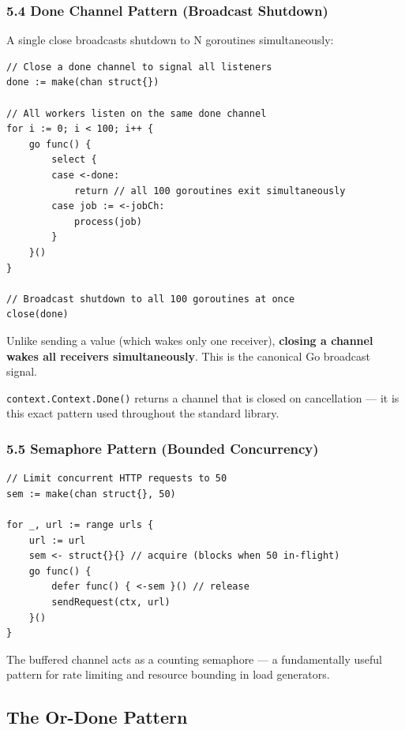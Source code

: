 \documentclass[11pt,a4paper,oneside]{book}
\begin{document}
\subsubsection{5.4 Done Channel Pattern (Broadcast
Shutdown)}

A single close broadcasts shutdown to N goroutines simultaneously:

\begin{verbatim}
// Close a done channel to signal all listeners
done := make(chan struct{})

// All workers listen on the same done channel
for i := 0; i < 100; i++ {
    go func() {
        select {
        case <-done:
            return // all 100 goroutines exit simultaneously
        case job := <-jobCh:
            process(job)
        }
    }()
}

// Broadcast shutdown to all 100 goroutines at once
close(done)
\end{verbatim}

Unlike sending a value (which wakes only one receiver), \textbf{closing
a channel wakes all receivers simultaneously}. This is the canonical Go
broadcast signal.

\texttt{context.Context.Done()} returns a channel that is closed on
cancellation --- it is this exact pattern used throughout the standard
library.

\subsubsection{5.5 Semaphore Pattern (Bounded
Concurrency)}

\begin{verbatim}
// Limit concurrent HTTP requests to 50
sem := make(chan struct{}, 50)

for _, url := range urls {
    url := url
    sem <- struct{}{} // acquire (blocks when 50 in-flight)
    go func() {
        defer func() { <-sem }() // release
        sendRequest(ctx, url)
    }()
}
\end{verbatim}

The buffered channel acts as a counting semaphore --- a fundamentally
useful pattern for rate limiting and resource bounding in load
generators.

\subsection{The Or-Done Pattern}
\end{document}
